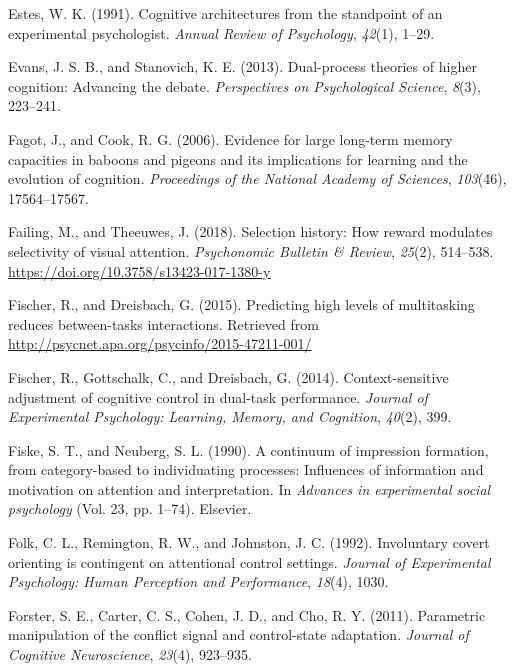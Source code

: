 \documentclass[]{DissertateCUNY}
\begin{document}
\leavevmode\hypertarget{ref-estes_cognitive_1991}{}%
Estes, W. K. (1991). Cognitive architectures from the standpoint of an
experimental psychologist. \emph{Annual Review of Psychology},
\emph{42}(1), 1--29.

\leavevmode\hypertarget{ref-evans_dual-process_2013}{}%
Evans, J. S. B., and Stanovich, K. E. (2013). Dual-process theories of
higher cognition: Advancing the debate. \emph{Perspectives on
Psychological Science}, \emph{8}(3), 223--241.

\leavevmode\hypertarget{ref-fagot_evidence_2006}{}%
Fagot, J., and Cook, R. G. (2006). Evidence for large long-term memory
capacities in baboons and pigeons and its implications for learning and
the evolution of cognition. \emph{Proceedings of the National Academy of
Sciences}, \emph{103}(46), 17564--17567.

\leavevmode\hypertarget{ref-failing_selection_2018}{}%
Failing, M., and Theeuwes, J. (2018). Selection history: How reward
modulates selectivity of visual attention. \emph{Psychonomic Bulletin \&
Review}, \emph{25}(2), 514--538.
\url{https://doi.org/10.3758/s13423-017-1380-y}

\leavevmode\hypertarget{ref-fischer_predicting_2015}{}%
Fischer, R., and Dreisbach, G. (2015). Predicting high levels of
multitasking reduces between-tasks interactions. Retrieved from
\url{http://psycnet.apa.org/psycinfo/2015-47211-001/}

\leavevmode\hypertarget{ref-fischer_context-sensitive_2014}{}%
Fischer, R., Gottschalk, C., and Dreisbach, G. (2014). Context-sensitive
adjustment of cognitive control in dual-task performance. \emph{Journal
of Experimental Psychology: Learning, Memory, and Cognition},
\emph{40}(2), 399.

\leavevmode\hypertarget{ref-fiske_continuum_1990}{}%
Fiske, S. T., and Neuberg, S. L. (1990). A continuum of impression
formation, from category-based to individuating processes: Influences of
information and motivation on attention and interpretation. In
\emph{Advances in experimental social psychology} (Vol. 23, pp. 1--74).
Elsevier.

\leavevmode\hypertarget{ref-folk_involuntary_1992}{}%
Folk, C. L., Remington, R. W., and Johnston, J. C. (1992). Involuntary
covert orienting is contingent on attentional control settings.
\emph{Journal of Experimental Psychology: Human Perception and
Performance}, \emph{18}(4), 1030.

\leavevmode\hypertarget{ref-forster_parametric_2011}{}%
Forster, S. E., Carter, C. S., Cohen, J. D., and Cho, R. Y. (2011).
Parametric manipulation of the conflict signal and control-state
adaptation. \emph{Journal of Cognitive Neuroscience}, \emph{23}(4),
923--935.
\end{document}
